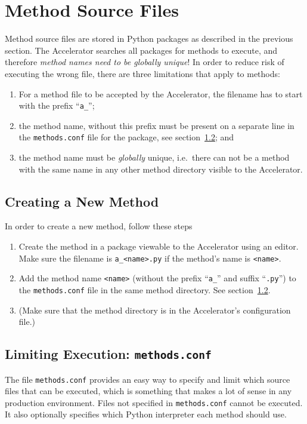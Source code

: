 \section{Method Source Files}
Method source files are stored in Python packages as described in the
previous section.  The Accelerator searches all packages for methods
to execute, and therefore \textsl{method names need to be globally
unique}!  In order to reduce risk of executing the wrong file, there
are three limitations that apply to methods:
\begin{enumerate}
\item For a method file to be accepted by the Accelerator, the
  filename has to start with the prefix ``\texttt{a\_}'';
\item the method name, without this prefix must be present on a
  separate line in the \texttt{methods.conf} file for the package, see
  section~\ref{sec:methods_conf}; and
\item the method name must be \emph{globally} unique, i.e.\ there can
  not be a method with the same name in any other method directory
  visible to the Accelerator.
\end{enumerate}


\subsection{Creating a New Method}
In order to create a new method, follow these steps
\begin{enumerate}
\item Create the method in a package viewable to the Accelerator
  using an editor.  Make sure the filename is \texttt{a\_<name>.py} if
  the method's name is \texttt{<name>}.
\item Add the method name \texttt{<name>} (without the prefix ``\texttt{a\_}'' and
  suffix ``\texttt{.py}'') to the \texttt{methods.conf} file in the
  same method directory.  See section~\ref{sec:methods_conf}.
\item (Make sure that the method directory is in the Accelerator's
  configuration file.)
\end{enumerate}


\subsection{Limiting Execution:  \texttt{methods.conf}}
\label{sec:methods_conf}
The file \texttt{methods.conf} provides an easy way to specify and
limit which source files that can be executed, which is something that
makes a lot of sense in any production environment.  Files not
specified in \texttt{methods.conf} cannot be executed.  It also
optionally specifies which Python interpreter each method should use.

